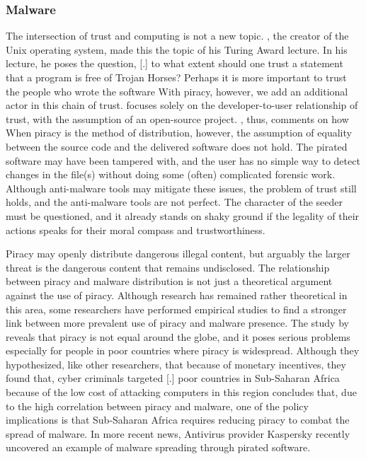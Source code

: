 \documentclass[onecolumn, 12pt]{article}
\begin{document}
\begin{refsection}
\subsubsection{Malware}
The intersection of trust and computing is not a new topic.
\citeauthor{thompson:trust}, the creator of the Unix operating system, made this
the topic of his Turing Award lecture. In his lecture, he poses the question,
[.]{%
  to what extent should one trust a statement that
  a program is free of Trojan Horses? Perhaps it is more important to trust the
  people who wrote the software%
} With piracy, however, we add an additional actor in this chain of trust.
\citeauthor{thompson:trust} focuses solely on the developer-to-user relationship
of trust, with the assumption of an open-source project.
\citeauthor{thompson:trust}, thus, comments on how
 When piracy is the method of distribution, however, the assumption of
equality between the source code and the delivered software does not hold. The
pirated software may have been tampered with, and the user has no simple way to
detect changes in the file(s) without doing some (often) complicated forensic
work. Although anti-malware tools may mitigate these issues, the problem of
trust still holds, and the anti-malware tools are not perfect. The character of
the seeder must be questioned, and it already stands on shaky ground if the
legality of their actions speaks for their moral compass and trustworthiness.

Piracy may openly distribute dangerous illegal content, but arguably the
larger threat is the dangerous content that remains undisclosed.
The relationship between piracy and malware distribution is not just a
theoretical argument against the use of piracy. Although research has remained
rather theoretical in this area, some researchers have performed empirical
studies to find a stronger link between more prevalent use of piracy and
malware presence. The study by \citeauthor{mezzour:empirical-study} reveals that
piracy is not equal around the globe, and it poses serious problems especially
for people in poor countries where piracy is widespread. Although they
hypothesized, like other researchers, that  because of monetary incentives, they found that, cyber criminals
targeted [.]{%
  poor countries in Sub-Saharan Africa because of the low cost of attacking
  computers in this region%
} \citeauthor{mezzour:empirical-study} concludes that, due to the high
correlation between piracy and malware, one of the policy implications is that
Sub-Saharan Africa requires reducing piracy to combat the spread of malware.
In more recent news, Antivirus provider Kaspersky recently uncovered an example
of malware spreading through pirated software.~\cite{pcmag:malware}


\end{refsection}
\end{document}

